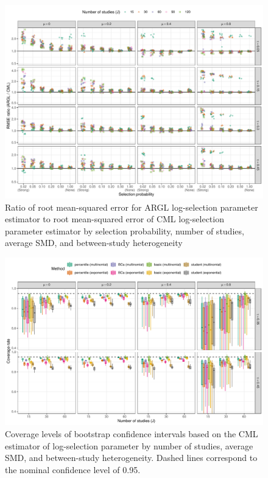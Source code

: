 \documentclass[
  man, donotrepeattitle,floatsintext]{apa7}
\begin{document}
\begin{figure}
\includegraphics{selection_models_draft_files/figure-latex/selection-rmse-ARGL-CML-1} \caption{Ratio of root mean-squared error for ARGL log-selection parameter estimator to root mean-squared error of CML log-selection parameter estimator by selection probability, number of studies, average SMD, and between-study heterogeneity}\label{fig:selection-rmse-ARGL-CML}
\end{figure}

\begin{figure}
\includegraphics{selection_models_draft_files/figure-latex/CML-zeta-coverage-full-1} \caption{Coverage levels of bootstrap confidence intervals based on the CML estimator of log-selection parameter by number of studies, average SMD, and between-study heterogeneity. Dashed lines correspond to the nominal confidence level of 0.95.}\label{fig:CML-zeta-coverage-full}
\end{figure}
\end{document}

